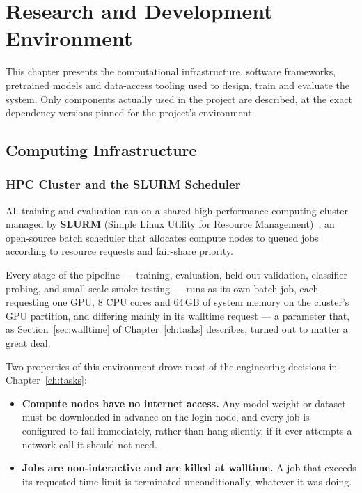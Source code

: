 \chapter{Research and Development Environment}
\label{ch:environment}

This chapter presents the computational infrastructure, software
frameworks, pretrained models and data-access tooling used to design,
train and evaluate the system. Only components actually used in the
project are described, at the exact dependency versions pinned for the
project's environment.

\section{Computing Infrastructure}

\subsection{HPC Cluster and the SLURM Scheduler}

All training and evaluation ran on a shared high-performance computing
cluster managed by \textbf{SLURM} (Simple Linux Utility for Resource
Management)~\cite{yoo2003slurm}, an open-source batch scheduler that
allocates compute nodes to queued jobs according to resource requests and
fair-share priority.

Every stage of the pipeline --- training, evaluation, held-out validation,
classifier probing, and small-scale smoke testing --- runs as its own
batch job, each requesting one GPU, 8 CPU cores and 64\,GB of system
memory on the cluster's GPU partition, and differing mainly in its
walltime request --- a parameter that, as Section~\ref{sec:walltime} of
Chapter~\ref{ch:tasks} describes, turned out to matter a great deal.

Two properties of this environment drove most of the engineering
decisions in Chapter~\ref{ch:tasks}:

\begin{itemize}[leftmargin=*]
  \item \textbf{Compute nodes have no internet access.} Any model weight
        or dataset must be downloaded in advance on the login node, and
        every job is configured to fail immediately, rather than hang
        silently, if it ever attempts a network call it should not need.
  \item \textbf{Jobs are non-interactive and are killed at walltime.} A
        job that exceeds its requested time limit is terminated
        unconditionally, whatever it was doing.
\end{itemize}

